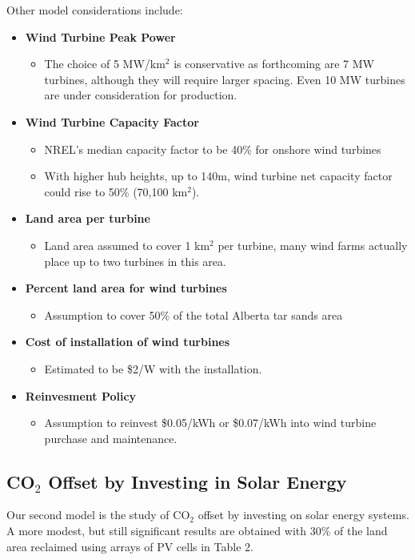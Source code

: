 \documentclass[11pt]{article}
\begin{document}
\noindent Other model considerations include:
\begin{itemize}
\item {\bf Wind Turbine Peak Power}
\begin{itemize}
\item The choice of 5 MW/km$^2$ is conservative as forthcoming are 7 MW turbines, although they will require larger spacing.  Even 10 MW turbines are under consideration for production.
\end{itemize}
\item {\bf Wind Turbine Capacity Factor}
\begin{itemize}
\item NREL's median capacity factor to be 40\% for onshore wind turbines
\item With higher hub heights, up to 140m, wind turbine net capacity factor could rise to 50\% (70,100 km$^2$).
\end{itemize}
\item {\bf Land area per turbine}
\begin{itemize}
\item Land area assumed to cover 1 km$^2$ per turbine, many wind farms actually place up to two turbines in this area.
\end{itemize}
\item {\bf Percent land area for wind turbines}
\begin{itemize}
\item Assumption to cover 50\% of the total Alberta tar sands area
\end{itemize}
\item {\bf Cost of installation of wind turbines}
\begin{itemize}
\item Estimated to be \$2/W with the installation.
\end{itemize}
\item {\bf Reinvesment Policy}
\begin{itemize}
\item Assumption to reinvest \$0.05/kWh or \$0.07/kWh into wind turbine purchase and maintenance.
\end{itemize}
\end{itemize}

\subsection{CO$_2$ Offset by Investing in Solar Energy}

Our second model is the study of CO$_2$ offset by investing on solar energy systems. A more modest, but still significant results are obtained with 30\% of the land area reclaimed using arrays of PV cells in Table 2.
\end{document}
